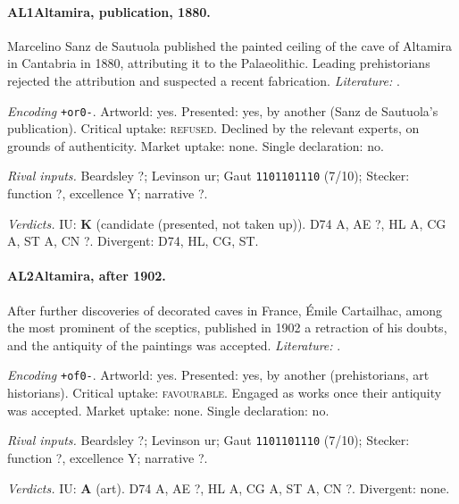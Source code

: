 \paragraph{AL1\enspace Altamira, publication, 1880.}
Marcelino Sanz de Sautuola published the painted ceiling of the cave of Altamira in Cantabria in 1880, attributing it to the Palaeolithic. Leading prehistorians rejected the attribution and suspected a recent fabrication. \textit{Literature:} \citet{Cartailhac1902}.\par
\noindent\textit{Encoding} \texttt{+or0-}. Artworld: yes. Presented: yes, by another (Sanz de Sautuola's publication). Critical uptake: \textsc{refused}. Declined by the relevant experts, on grounds of authenticity. Market uptake: none. Single declaration: no.\par
\noindent\textit{Rival inputs.} Beardsley ?; Levinson ur; Gaut \texttt{1101101110} (7/10); Stecker: function ?, excellence Y; narrative ?.\par
\noindent\textit{Verdicts.} IU: \textbf{K} (candidate (presented, not taken up)). D74 A, AE ?, HL A, CG A, ST A, CN ?. Divergent: D74, HL, CG, ST.\par

\paragraph{AL2\enspace Altamira, after 1902.}
After further discoveries of decorated caves in France, \'Emile Cartailhac, among the most prominent of the sceptics, published in 1902 a retraction of his doubts, and the antiquity of the paintings was accepted. \textit{Literature:} \citet{Cartailhac1902}.\par
\noindent\textit{Encoding} \texttt{+of0-}. Artworld: yes. Presented: yes, by another (prehistorians, art historians). Critical uptake: \textsc{favourable}. Engaged as works once their antiquity was accepted. Market uptake: none. Single declaration: no.\par
\noindent\textit{Rival inputs.} Beardsley ?; Levinson ur; Gaut \texttt{1101101110} (7/10); Stecker: function ?, excellence Y; narrative ?.\par
\noindent\textit{Verdicts.} IU: \textbf{A} (art). D74 A, AE ?, HL A, CG A, ST A, CN ?. Divergent: none.\par

